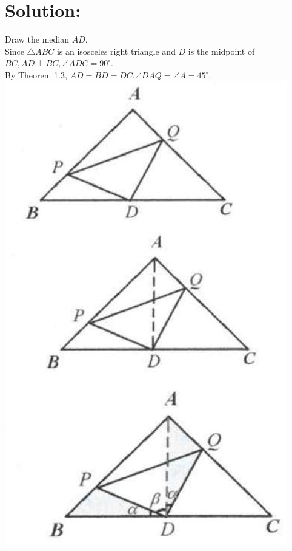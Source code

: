 \documentclass[10pt]{article}
\begin{document}
\section*{Solution:}
Draw the median \(A D\).\\
Since \(\triangle A B C\) is an isosceles right triangle and \(D\) is the midpoint of \(B C, A D \perp B C, \angle A D C=90^{\circ}\).\\
By Theorem 1.3, \(A D=B D=D C . \angle D A Q=\angle A=45^{\circ}\).\\
\includegraphics[max width=\textwidth, center]{2025_04_17_97bc1f7e44d93c271a88g-013(1)}
\end{document}

